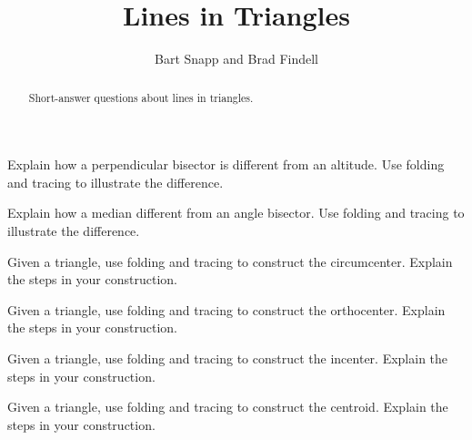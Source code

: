 \documentclass[nooutcomes]{ximera}
\title{Lines in Triangles}
\author{Bart Snapp and Brad Findell}
\begin{document}
\begin{abstract}
Short-answer questions about lines in triangles. 
\end{abstract}
\maketitle



\begin{problem}
Explain how a perpendicular bisector is different from an
  altitude. Use folding and tracing to illustrate the difference.
\end{problem}

\begin{problem}
Explain how a median different from an angle bisector.  Use
  folding and tracing to illustrate the difference.
\end{problem}

\begin{problem}
Given a triangle, use folding and tracing to construct the
  circumcenter. Explain the steps in your
  construction.
\end{problem}

\begin{problem}
Given a triangle, use folding and tracing to construct the
  orthocenter. Explain the steps in your
  construction.
\end{problem}

\begin{problem}
Given a triangle, use folding and tracing to construct the incenter. Explain
  the steps in your construction.
\end{problem}

\begin{problem}
Given a triangle, use folding and tracing to construct the centroid. Explain
  the steps in your construction.
\end{problem}
\end{document}
